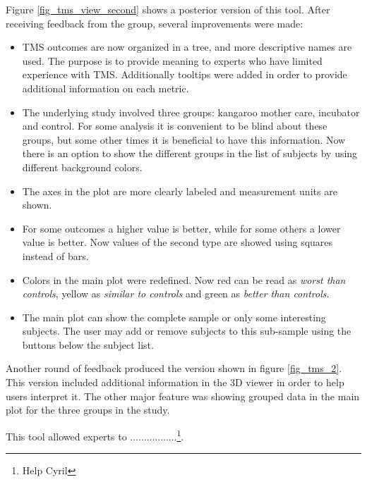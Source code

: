 Figure \ref{fig_tms_view_second} shows a posterior version of this tool. After receiving feedback from the group, several improvements were made:
\begin{itemize}
	\item TMS outcomes are now organized in a tree, and more descriptive names are used. The purpose is to provide meaning to experts who have limited experience with TMS. Additionally tooltips were added in order to provide additional information on each metric.
	\item The underlying study involved three groups: kangaroo mother care, incubator and control. For some analysis it is convenient to be blind about these groups, but some other times it is beneficial to have this information. Now there is an option to show the different groups in the list of subjects by using different background colors.
	\item The axes in the plot are more clearly labeled and measurement units are shown. 
	\item For some outcomes a higher value is better, while for some others a lower value is better. Now values of the second type are showed using squares instead of bars.
	\item Colors in the main plot were redefined. Now red can be read as \emph{worst than controls}, yellow as \emph{similar to controls} and green as \emph{better than controls}.
	\item The main plot can show the complete sample or only some interesting subjects. The user may add or remove subjects to this sub-sample using the buttons below the subject list.
\end{itemize}

Another round of feedback produced the version shown in figure \ref{fig_tms_2}. This version included additional information in the 3D viewer in order to help users interpret it. The other major feature was showing grouped data in the main plot for the three groups in the study.

This tool allowed experts to .................\footnote{Help Cyril}.



